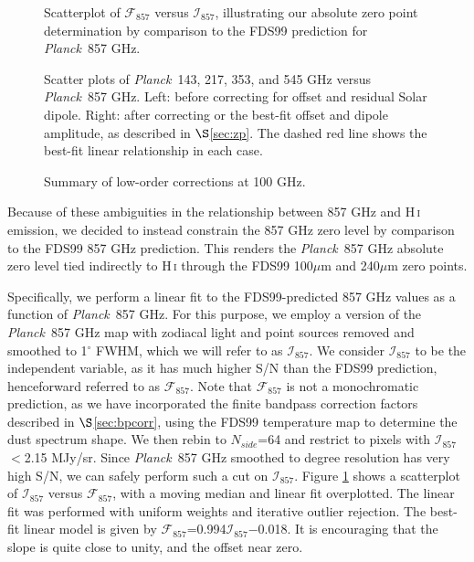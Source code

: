 \documentclass{emulateapj}
\newcommand{\PLANCK}{{\it Planck}}
\begin{document}
\begin{figure}
\begin{center}
\caption{\label{fig:fdsref} Scatterplot of $\mathcal{F}_{857}$ versus 
$\mathcal{I}_{857}$, illustrating our absolute zero point determination by
comparison to the FDS99 prediction for \PLANCK~857 GHz.}
\end{center}
\end{figure}

\begin{figure}
\begin{center}
\caption{\label{fig:dip}  Scatter plots of \PLANCK~143, 217, 353, and 545 GHz 
versus \PLANCK~857 GHz. Left: before correcting for offset and residual Solar 
dipole. Right: after correcting or the best-fit offset and dipole amplitude, as
described in $\S$\ref{sec:zp}. The dashed red line shows the best-fit linear 
relationship in each case.}
\end{center}
\end{figure}

\begin{figure*}
\begin{center}
\caption{\label{fig:quad} Summary of low-order corrections at 100 GHz.}
\end{center}
\end{figure*}

Because of these ambiguities in the relationship between 857 GHz and 
H\,\textsc{i} emission, we decided to instead constrain the 857 GHz zero level 
by comparison to the FDS99 857 GHz prediction. This renders the \PLANCK~857 GHz
absolute zero level tied indirectly to H\,\textsc{i} through the FDS99 
100$\mu$m and 240$\mu$m zero points. 

Specifically, we perform a linear fit to the FDS99-predicted 857 GHz values as 
a function of \PLANCK~857 GHz. For this purpose, we employ a version of the 
\PLANCK~857 GHz map with zodiacal light and point sources removed and smoothed 
to 1$^{\circ}$ FWHM, which we will refer to as $\mathcal{I}_{857}$. We 
consider $\mathcal{I}_{857}$ to be the independent variable, as it has much 
higher S/N than the FDS99 prediction, henceforward referred to as 
$\mathcal{F}_{857}$. Note that $\mathcal{F}_{857}$ is not a monochromatic 
prediction, as we have incorporated the finite bandpass correction factors 
described in $\S$\ref{sec:bpcorr}, using the FDS99 temperature map to determine
the dust spectrum shape. We then rebin to $N_{side}$=64 and restrict to pixels 
with $\mathcal{I}_{857}$$<$2.15 MJy/sr. Since \PLANCK~857 GHz smoothed to 
degree resolution has very high S/N, we can safely perform such a cut on 
$\mathcal{I}_{857}$. Figure \ref{fig:fdsref} shows a scatterplot of 
$\mathcal{I}_{857}$ versus $\mathcal{F}_{857}$, with a moving median and linear
fit overplotted. The linear fit was performed with uniform weights and 
iterative outlier rejection. The best-fit linear model is given by 
$\mathcal{F}_{857}$=0.994$\mathcal{I}_{857}$$-$0.018. It is encouraging that 
the slope is quite close to unity, and the offset near zero.
\end{document}
